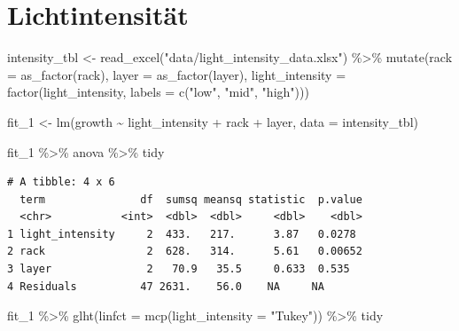 \documentclass[
  letterpaper,
]{scrbook}
\newenvironment{Shaded}{\begin{snugshade}}{\end{snugshade}}
\newcommand{\AttributeTok}[1]{\textcolor[rgb]{0.40,0.45,0.13}{#1}}
\newcommand{\FunctionTok}[1]{\textcolor[rgb]{0.28,0.35,0.67}{#1}}
\newcommand{\NormalTok}[1]{\textcolor[rgb]{0.00,0.23,0.31}{#1}}
\newcommand{\OtherTok}[1]{\textcolor[rgb]{0.00,0.23,0.31}{#1}}
\newcommand{\SpecialCharTok}[1]{\textcolor[rgb]{0.37,0.37,0.37}{#1}}
\newcommand{\StringTok}[1]{\textcolor[rgb]{0.13,0.47,0.30}{#1}}
\begin{document}
\hypertarget{lichtintensituxe4t}{%
\section{Lichtintensität}\label{lichtintensituxe4t}}

\begin{Shaded}
\begin{Highlighting}[]
\NormalTok{intensity\_tbl }\OtherTok{\textless{}{-}} \FunctionTok{read\_excel}\NormalTok{(}\StringTok{"data/light\_intensity\_data.xlsx"}\NormalTok{) }\SpecialCharTok{\%\textgreater{}\%} 
  \FunctionTok{mutate}\NormalTok{(}\AttributeTok{rack =} \FunctionTok{as\_factor}\NormalTok{(rack),}
         \AttributeTok{layer =} \FunctionTok{as\_factor}\NormalTok{(layer),}
         \AttributeTok{light\_intensity =} \FunctionTok{factor}\NormalTok{(light\_intensity, }
                                  \AttributeTok{labels =} \FunctionTok{c}\NormalTok{(}\StringTok{"low"}\NormalTok{, }\StringTok{"mid"}\NormalTok{, }\StringTok{"high"}\NormalTok{)))}
\end{Highlighting}
\end{Shaded}

\begin{Shaded}
\begin{Highlighting}[]
\NormalTok{fit\_1 }\OtherTok{\textless{}{-}} \FunctionTok{lm}\NormalTok{(growth }\SpecialCharTok{\textasciitilde{}}\NormalTok{ light\_intensity }\SpecialCharTok{+}\NormalTok{ rack }\SpecialCharTok{+}\NormalTok{ layer, }\AttributeTok{data =}\NormalTok{ intensity\_tbl)}

\NormalTok{fit\_1 }\SpecialCharTok{\%\textgreater{}\%}\NormalTok{ anova }\SpecialCharTok{\%\textgreater{}\%}\NormalTok{ tidy}
\end{Highlighting}
\end{Shaded}

\begin{verbatim}
# A tibble: 4 x 6
  term               df  sumsq meansq statistic  p.value
  <chr>           <int>  <dbl>  <dbl>     <dbl>    <dbl>
1 light_intensity     2  433.   217.      3.87   0.0278 
2 rack                2  628.   314.      5.61   0.00652
3 layer               2   70.9   35.5     0.633  0.535  
4 Residuals          47 2631.    56.0    NA     NA      
\end{verbatim}

\begin{Shaded}
\begin{Highlighting}[]
\NormalTok{fit\_1 }\SpecialCharTok{\%\textgreater{}\%} \FunctionTok{glht}\NormalTok{(}\AttributeTok{linfct =} \FunctionTok{mcp}\NormalTok{(}\AttributeTok{light\_intensity =} \StringTok{"Tukey"}\NormalTok{)) }\SpecialCharTok{\%\textgreater{}\%}\NormalTok{ tidy}
\end{Highlighting}
\end{Shaded}
\end{document}
